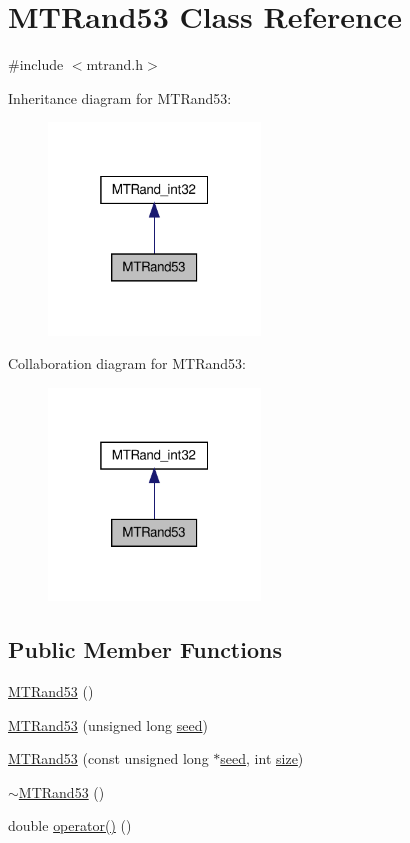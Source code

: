 \hypertarget{a00011}{\section{M\-T\-Rand53 Class Reference}
\label{a00011}
}


{\ttfamily \#include $<$mtrand.\-h$>$}



Inheritance diagram for M\-T\-Rand53\-:\nopagebreak
\begin{figure}[H]
\begin{center}
\leavevmode
\includegraphics[width=160pt]{a00148}
\end{center}
\end{figure}


Collaboration diagram for M\-T\-Rand53\-:\nopagebreak
\begin{figure}[H]
\begin{center}
\leavevmode
\includegraphics[width=160pt]{a00149}
\end{center}
\end{figure}
\subsection*{Public Member Functions}
\begin{DoxyCompactItemize}
\item 
\hyperlink{a00011_a24711c9e6e5ee72715f34515d1f1939a}{M\-T\-Rand53} ()
\item 
\hyperlink{a00011_ad800887e15d4095f22facdb67f270c5e}{M\-T\-Rand53} (unsigned long \hyperlink{a00013_a0c57076fe30358e0700a7ce1baa0ea27}{seed})
\item 
\hyperlink{a00011_ac77b190d3ac27adea2d2c6c2ce2347c3}{M\-T\-Rand53} (const unsigned long $\ast$\hyperlink{a00013_a0c57076fe30358e0700a7ce1baa0ea27}{seed}, int \hyperlink{a00056_ae113ea7f9e515a12ac4b5595c6faf61e}{size})
\item 
\hyperlink{a00011_a947a6a7afd0c8a17612cda3faa705a75}{$\sim$\-M\-T\-Rand53} ()
\item 
double \hyperlink{a00011_ab6657cb5349f39bc4553d3a970458b45}{operator()} ()
\end{DoxyCompactItemize}
